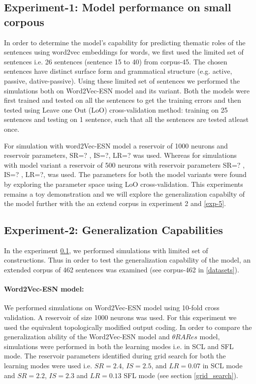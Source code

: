 \subsection{Experiment-1: Model performance on small corpous}\label{exp-1}

In order to determine the model's capability for predicting thematic roles of the sentences using word2vec embeddings for words, we first used the limited set of sentences i.e. 26 sentences (sentence 15 to 40) from corpus-45. The chosen sentences have distinct surface form and grammatical structure (e.g. active, passive, dative-passive). Using these limited set of sentences we performed the simulations both on Word2Vec-ESN model and its variant. Both the models were first trained and tested on all the sentences to get the training errors and then tested using Leave one Out (LoO) cross-validation method: training on 25 sentences and testing on 1 sentence, such that all the sentences are tested atleast once.
 
For simulation with word2Vec-ESN model a reservoir of 1000 neurons and reservoir parameters, SR=? , IS=?, LR=? was used. Whereas for simulations with model variant a reservoir of 500 neurons with reservoir parameters SR=? , IS=? , LR=?, was used. The parameters for both the model variants were found by exploring the parameter space using LoO cross-validation. This experiments remains a toy demonstration and we will explore the generalization capabilty of the model further with the an extend corpus in experiment 2 and \ref{exp-5}.

\subsection{Experiment-2: Generalization Capabilities} \label{exp-2}

In the experiment \ref{exp-1}, we performed simulations with limited set of constructions. Thus in order to test the generalization capability of the model, an extended corpus of 462 sentences was examined (see corpus-462 in \ref{datasets}). 

\paragraph{Word2Vec-ESN model:}We performed simulations on Word2Vec-ESN model using 10-fold cross validation. A reservoir of size 1000 neurons was used. For this experiment we used the equivalent topologically modified output coding. In order to compare the generalization ability of the Word2Vec-ESN model and $\theta RARes$ model, simulations were performed in both the learning modes i.e. in SCL and SFL mode. The reservoir parameters identified during grid search for both the learning modes were used i.e. $SR = 2.4$, $IS = 2.5$, and $LR = 0.07$ in SCL mode and $SR = 2.2$, $IS = 2.3$ and $LR = 0.13$ SFL mode (see section \ref{grid_search}).

